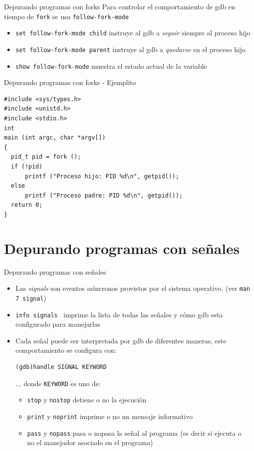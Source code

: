\documentclass[xetex]{beamer}
\begin{document}
\begin{frame}[fragile]{Depurando programas con forks}
Para controlar el comportamiento de gdb en tiempo de \verb=fork= se usa
\verb=follow-fork-mode=
\begin{itemize}
\item \verb#set follow-fork-mode child# instruye al gdb a {\it seguir} siempre al proceso hijo
\item \verb#set follow-fork-mode parent# instruye al gdb a {\it quedarse} en el proceso hijo
\item \verb#show follow-fork-mode# muestra el estado actual de la variable
\end{itemize}
\end{frame}

\begin{frame}[fragile]{Depurando programas con forks - Ejemplito}
\begin{lstlisting}
#include <sys/types.h>
#include <unistd.h>
#include <stdio.h>
int
main (int argc, char *argv[])
{
  pid_t pid = fork ();
  if (!pid)
      printf ("Proceso hijo: PID %d\n", getpid());
  else
      printf ("Proceso padre: PID %d\n", getpid());
  return 0;
}
\end{lstlisting}
\end{frame}

\section{Depurando programas con señales}

\begin{frame}[fragile]{Depurando programas con señales}
\begin{itemize}
\item Las {\it signals} son eventos asíncronos provistos por el sistema operativo. (ver \verb=man 7 signal=)
\item \verb=info signals = imprime la lista de todas las señales y cómo gdb esta configurado para manejarlas
\item Cada señal puede ser interpretada por gdb de diferentes maneras, este comportamiento se configura con:
\begin{verbatim}
(gdb)handle SIGNAL KEYWORD
\end{verbatim}
... donde \verb=KEYWORD= es uno de:
\begin{itemize}
\item \verb=stop= y \verb=nostop= detiene o no la ejecución
\item \verb=print= y \verb=noprint= imprime o no un mensaje informativo
\item \verb=pass= y \verb=nopass= pasa o nopasa la señal al programa (es decir si ejecuta o no el manejador asociado en el programa)
\end{itemize}
\end{itemize}
\end{frame}
\end{document}
